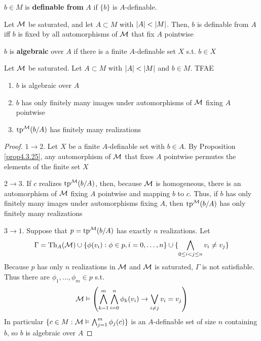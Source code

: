 \documentclass[11pt]{article}
\begin{document}
\(b\in M\) is \textbf{definable from} \(A\) if \(\{b\}\) is \(A\)-definable.

\begin{corollary}[]
Let \(\mathcal{M}\) be saturated, and let \(A\subset M\) with \(\abs{A}<\abs{M}\). Then, \(b\) is definable
from \(A\) iff \(b\) is fixed by all automorphisms of \(\mathcal{M}\) that fix \(A\) pointwise
\end{corollary}

\(b\) is \textbf{algebraic} over \(A\) if there is a finite \(A\)-definable set \(X\) s.t. \(b\in X\)

\begin{proposition}[]
Let \(\mathcal{M}\) be saturated. Let \(A\subset M\) with \(\abs{A}<\abs{M}\) and \(b\in M\). TFAE
\begin{enumerate}
\item \(b\) is algebraic over \(A\)
\item \(b\) has only finitely many images under automorphisms of \(\mathcal{M}\) fixing \(A\) pointwise
\item \(\operatorname{tp}^{\mathcal{M}}(b/A)\) has finitely many realizations
\end{enumerate}
\end{proposition}

\begin{proof}
\(1\to 2\). Let \(X\) be a finite \(A\)-definable set with \(b\in A\). By Proposition \ref{prop4.3.25},
any automorphism of \(\mathcal{M}\) that fixes \(A\) pointwise permutes the elements of the finite
set \(X\)

\(2\to 3\). If \(c\) realizes \(\operatorname{tp}^{\mathcal{M}}(b/A)\), then, because \(\mathcal{M}\) is homogeneous, there is an
automorphism of \(\mathcal{M}\) fixing \(A\) pointwise and mapping \(b\) to \(c\). Thus, if \(b\) has only
finitely many images under automorphisms fixing \(A\), then \(\operatorname{tp}^{\mathcal{M}}(b/A)\) has only finitely
many realizations

\(3\to 1\). Suppose that \(p=\operatorname{tp}^{\mathcal{M}}(b/A)\)  has exactly \(n\) realizations. Let
\begin{equation*}
\Gamma=\operatorname{Th}_A(\mathcal{M})\cup\{\phi(v_i):\phi\in p,i=0,\dots,n\}\cup\{\bigwedge_{0\le i<j\le n}v_i\neq v_j\}
\end{equation*}
Because \(p\) has only \(n\) realizations in \(\mathcal{M}\) and \(\mathcal{M}\) is saturated, \(\Gamma\) is not satisfiable.
Thus there are \(\phi_1,\dots,\phi_m\in p\) s.t.
\begin{equation*}
\mathcal{M}\vDash\left( \bigwedge_{k=1}^m\bigwedge_{i=0}^n\phi_k(v_i)\to\bigvee_{i\neq j}v_i=v_j \right)
\end{equation*}
In particular \(\{c\in M:\mathcal{M}\vDash\bigwedge_{j=1}^m\phi_j(c)\}\) is an \(A\)-definable set of size \(n\)
containing \(b\), so \(b\) is algebraic over \(A\)
\end{proof}
\end{document}

